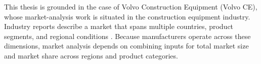 This thesis is grounded in the case of Volvo Construction Equipment (Volvo CE), whose market-analysis work is situated in the construction equipment industry. Industry reports describe a market that spans multiple countries, product segments, and regional conditions \cite{cece2025,mordor2024construction}. Because manufacturers operate across these dimensions, market analysis depends on combining inputs for total market size and market share across regions and product categories.







